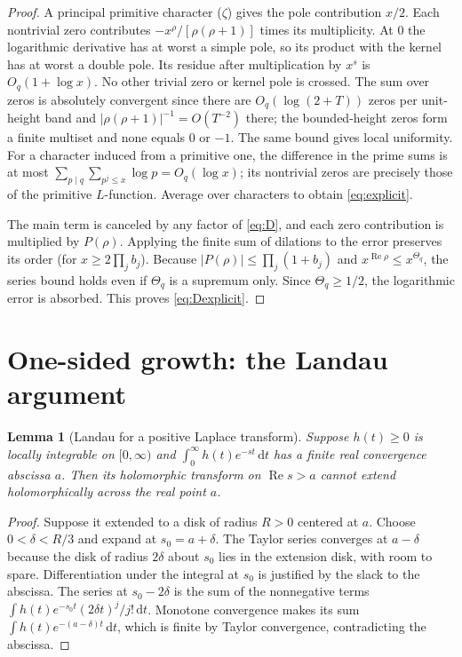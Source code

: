 \documentclass[11pt]{article}
\newtheorem{lemma}[theorem]{Lemma}
\newcommand{\Rea}{\operatorname{Re}}
\newcommand{\dd}{\,\mathrm d}
\begin{document}
\begin{proof}
A principal primitive character ($\zeta$) gives the pole contribution $x/2$. Each nontrivial zero contributes $-x^\rho/[\rho(\rho+1)]$ times its multiplicity. At $0$ the logarithmic derivative has at worst a simple pole, so its product with the kernel has at worst a double pole. Its residue after multiplication by $x^s$ is $O_q(1+\log x)$. No other trivial zero or kernel pole is crossed. The sum over zeros is absolutely convergent since there are $O_q(\log(2+T))$ zeros per unit-height band and $|\rho(\rho+1)|^{-1}=O(T^{-2})$ there; the bounded-height zeros form a finite multiset and none equals 0 or $-1$. The same bound gives local uniformity. For a character induced from a primitive one, the difference in the prime sums is at most $\sum_{p\mid q}\sum_{p^j\le x}\log p=O_q(\log x)$; its nontrivial zeros are precisely those of the primitive $L$-function. Average over characters to obtain \eqref{eq:explicit}.

The main term is canceled by any factor of \eqref{eq:D}, and each zero contribution is multiplied by $P(\rho)$. Applying the finite sum of dilations to the error preserves its order (for $x\ge2\prod_j b_j$). Because $|P(\rho)|\le\prod_j(1+b_j)$ and $x^{\Rea\rho}\le x^{\Theta_q}$, the series bound holds even if $\Theta_q$ is a supremum only. Since $\Theta_q\ge1/2$, the logarithmic error is absorbed. This proves \eqref{eq:Dexplicit}.
\end{proof}

\section{One-sided growth: the Landau argument}
\begin{lemma}[Landau for a positive Laplace transform]\label{lem:landau}
Suppose $h(t)\ge0$ is locally integrable on $[0,\infty)$ and $\int_0^\infty h(t)e^{-st}\dd t$ has a finite real convergence abscissa $a$. Then its holomorphic transform on $\Rea s>a$ cannot extend holomorphically across the real point $a$.
\end{lemma}
\begin{proof}
Suppose it extended to a disk of radius $R>0$ centered at $a$. Choose $0<\delta<R/3$ and expand at $s_0=a+\delta$. The Taylor series converges at $a-\delta$ because the disk of radius $2\delta$ about $s_0$ lies in the extension disk, with room to spare. Differentiation under the integral at $s_0$ is justified by the slack to the abscissa. The series at $s_0-2\delta$ is the sum of the nonnegative terms $\int h(t)e^{-s_0t}(2\delta t)^j/j!\dd t$. Monotone convergence makes its sum $\int h(t)e^{-(a-\delta)t}\dd t$, which is finite by Taylor convergence, contradicting the abscissa.
\end{proof}
\end{document}
